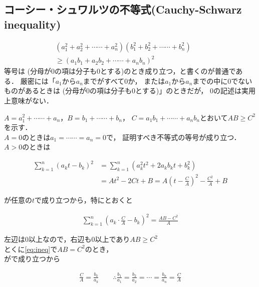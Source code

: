 \documentclass[twocolumn]{ltjsarticle}
\begin{document}
\subsection{コーシー・シュワルツの不等式(Cauchy-Schwarz inequality)}
\begin{spacing}{1.3}
\begin{gather*}
  (a_{1}^2+a_{2}^2 + \cdots\cdots + a_{n}^2)(b_{1}^2+b_{2}^2 + \cdots\cdots + b_{n}^2) \qquad \\
  \geq (a_{1}b_{1} + a_{2}b_{2} + \cdots \cdots + a_{n}b_{n})^2
\end{gather*}
等号は
(分母が0の項は分子も0とする)のとき成り立つ，と書くのが普通である．
厳密には「$a_{1}$から$a_{n}$までがすべて0か，
または$a_{1}$から$a_{n}$までの中に0でないものがあるときは
(分母が0の項は分子も0とする)」のときだが，
0の記述は実用上意味がない．
\end{spacing}

\begin{syoumei*}
  $A=a_{1}^2+\cdots\cdots + a_{n}$，$B=b_{1}+\cdots\cdots+b_{n}$，
  $C=a_{1}b_{1}+\cdots\cdots +a_{n}b_{n}$とおいて$AB\geq C^2$を示す．\\
  $A=0$のときは$a_{1} = \cdots\cdots =a_{n}=0$で，
  証明すべき不等式の等号が成り立つ．$A>0$のときは
  \begin{fleqn}[20pt]
    \begin{align*}
      \sum_{k=1}^{n}(a_{k}t-b_{k})^2
      &= \sum_{k=1}^{n}(a_{k}^2t^2 + 2a_{k}b_{k}t + b_{k}^2) \\
      &= At^2 -2Ct + B
      = A\left(t-\frac{C}{A}\right)^2 - \frac{C^2}{A} + B
    \end{align*}
  \end{fleqn}
  が任意の$t$で成り立つから，特にとおくと
  \begin{fleqn}[20pt]
    \begin{align*}
      \sum_{k=1}^{n}\left(a_{k}\cdot\frac{C}{A}-b_{k}\right)^2 = \frac{AB-C^2}{A} \tag*{(1)} \label{eq:ineq}
    \end{align*}
  \end{fleqn}
  左辺は$0$以上なので，右辺も$0$以上であり$AB\geq C^2$\\
  とくに\ref*{eq:ineq}で$AB=C^2$のとき，
  \\
  がで成り立つから\\
  \begin{fleqn}[20pt]
    \begin{align*}
      \frac{C}{A} = \frac{b_{k}}{a_{k}}\qquad
      \therefore \frac{b_{1}}{a_{1}}
                =\frac{b_{2}}{a_{2}}
                =\cdots
                =\frac{b_{n}}{a_{n}}
                =\frac{C}{A}
    \end{align*}
  \end{fleqn}
\end{syoumei*}
\end{document}
